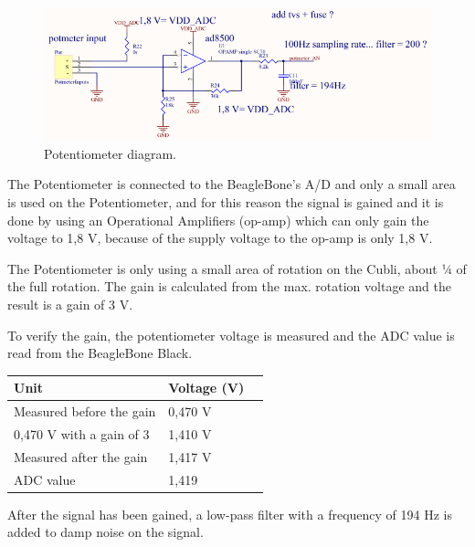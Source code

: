 \begin{figure}[H]
	\centering
	\includegraphics[scale=0.92]{figures/Potmeter.pdf}
	\caption{Potentiometer diagram.}
	\label{labPotmeter}
\end{figure}\vspace{-5mm}

The Potentiometer is connected to the BeagleBone’s A/D and only a small area is used on the Potentiometer, and for this reason the signal is gained and it is done by using an Operational Amplifiers (op-amp) which can only gain the voltage to 1,8 V, because of the supply voltage to the op-amp is only 1,8 V.

The Potentiometer is only using a small area of rotation on the Cubli, about ¼ of the full rotation. The gain is calculated from the max. rotation voltage and the result is a gain of 3 V. 

To verify the gain, the potentiometer voltage is measured and the ADC value is read from the BeagleBone Black.
\begin{table}[H]
	\begin{tabular}{|l|l|p{4.3cm}|}
		\hline%
		\textbf{Unit}       &  \textbf{Voltage (V)}         \\
		\hline%
		Measured before the gain                               & 0,470 V           \\
		\hline%
		0,470 V with a gain of 3							  & 1,410 V              \\
		\hline%
		Measured after the gain							  & 1,417 V              \\
		\hline%
		ADC value  							  & 1,419              \\
		\hline%
	\end{tabular}
\end{table}
After the signal has been gained, a low-pass filter with a frequency of 194 Hz is added to damp noise on the signal. 

